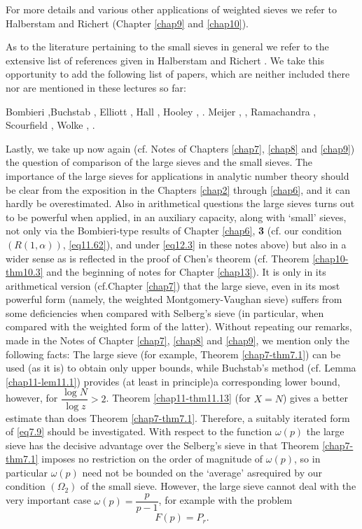 For more details and various other applications of weighted sieves we
refer to Halberstam and Richert \cite{key1} (Chapter \ref{chap9} and
\ref{chap10}).  

As to the literature pertaining to the small sieves in general we
refer to the extensive list of references given in Halberstam and
Richert \cite{key1}. We take this opportunity to add the following list of
papers, which are neither included there nor are mentioned in these
lectures so far: 

Bombieri \cite{key7},\pageoriginale Buchstab \cite{key3}, Elliott
\cite{key3}, Hall 
\cite{key1}, Hooley \cite{key3}, \cite{key10}. Meijer \cite{key1},
\cite{key2}, Ramachandra \cite{key5}, Scourfield \cite{key1}, Wolke
\cite{key4}, \cite{key8}.

Lastly, we take up now again (cf. Notes of Chapters \ref{chap7},
\ref{chap8} and \ref{chap9}) the 
question of comparison of the large sieves and the small sieves. The
importance of the large sieves for applications in analytic number
theory should be clear from the exposition in the Chapters \ref{chap2} through
\ref{chap6}, and it can hardly be overestimated. Also in arithmetical
questions the large sieves turns out to be powerful when applied, in
an auxiliary capacity, along with `small' sieves, not only via the
Bombieri-type results of Chapter \ref{chap6}, {\bf 3} (cf. our condition $(R(1,
\alpha))$, \eqref{eq11.62}), and under \eqref{eq12.3} in these notes
above) but also 
in a wider sense as is reflected in the proof of Chen's theorem
(cf. Theorem \ref{chap10-thm10.3} and the beginning of notes for
Chapter \ref{chap13}). It 
is only in its arithmetical version (cf.Chapter \ref{chap7}) that the large
sieve, even in its most powerful form (namely, the weighted
Montgomery-Vaughan sieve) suffers from some deficiencies when compared
with Selberg's sieve (in particular, when compared with the weighted
form of the latter). Without repeating our remarks, made in the Notes
of Chapter \ref{chap7}, \ref{chap8} and \ref{chap9}, we mention only
the following facts: The 
large sieve (for example, Theorem \ref{chap7-thm7.1}) can be used (as
it is) to 
obtain only upper bounds, while Buchstab's method (cf. Lemma
\ref{chap11-lem11.1}) 
provides (at least in principle)a corresponding lower bound, however,
for $\dfrac{\log N}{\log z}>2$. Theorem \ref{chap11-thm11.13} (for
$X = N$) gives a
better estimate than does Theorem \ref{chap7-thm7.1}. Therefore, a
suitably iterated 
form of \eqref{eq7.9} should be investigated. With respect to the function
$\omega(p)$ the large sieve has the decisive advantage over the
Selberg's sieve in that Theorem \ref{chap7-thm7.1} imposes no
restriction on the order of magnitude of $\omega(p)$, so in particular
$\omega(p)$ need 
not be bounded on the `average' as\pageoriginale required by our condition
$(\Omega_2)$ of the small sieve. However, the large sieve cannot deal
with the very important case $\omega(p)=\dfrac{p}{p-1}$, for example
with the problem 
\begin{equation*}
F(p)=P_r. \tag{12.54}\label{eq12.54}
\end{equation*}

